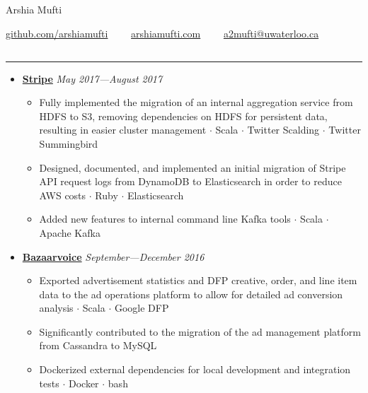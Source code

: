 \documentclass[5pt,letterpaper]{article}
\newcommand{\dt}{$\cdot$ }
\begin{document}
\begin{center}
  {\huge Arshia Mufti}


  \href{https://github.com/arshiamufti/}{github.com/arshiamufti}\ \ \textbullet
  \ \ \href{http://arshiamufti.com}{arshiamufti.com}\ \ \textbullet
  \ \ \href{mailto:a2mufti@uwaterloo.ca}{a2mufti@uwaterloo.ca}

\end{center}
\vspace{-2.0em}
\subsection*{}
\hrule
\vspace{1.0em}
\begin{itemize}[leftmargin=1em, noitemsep]

  \item[]
    {\href{https://stripe.com}{\textbf{Stripe}} \hfill
    \emph{May 2017---August 2017}}

    \begin{itemize}[label=\textbullet, noitemsep, nosep]
      \item Fully implemented the migration of an internal aggregation service
        from HDFS to S3, removing dependencies on HDFS for persistent data, resulting in easier cluster
        management \dt Scala \dt Twitter Scalding \dt Twitter Summingbird
      \item Designed, documented, and implemented an initial migration of Stripe
        API request logs from DynamoDB to Elasticsearch in order to reduce AWS
        costs \dt Ruby \dt Elasticsearch
      \item Added new features to internal command line Kafka tools \dt Scala \dt Apache Kafka
    \end{itemize}

  \item[]
    {\href{http://www.bazaarvoice.com}{\textbf{Bazaarvoice}} \hfill
    \emph{September---December 2016}}

    \begin{itemize}[label=\textbullet, noitemsep, nosep]
      \item Exported advertisement statistics and DFP creative, order, and line
        item data to the ad operations platform to allow for detailed ad
        conversion analysis \dt Scala \dt Google DFP
      \item Significantly contributed to the migration of the ad
        management platform from Cassandra to MySQL
      \item Dockerized external dependencies for local development and
        integration tests \dt Docker \dt bash
    \end{itemize}


\end{itemize}
\end{document}

